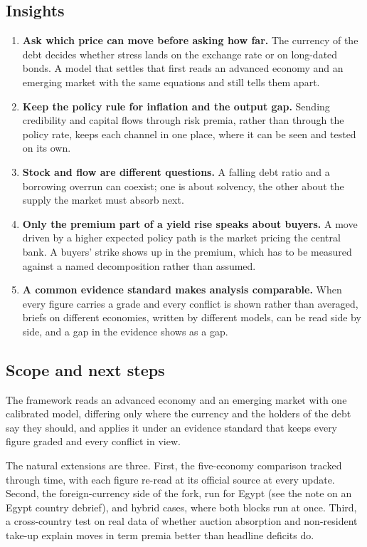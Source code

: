 \documentclass[
  british,
  a4paper,
]{article}
\providecommand{\tightlist}{%
  \setlength{\itemsep}{0pt}\setlength{\parskip}{0pt}}
\begin{document}
\subsection{Insights}\label{insights}

\begin{enumerate}
\def\labelenumi{\arabic{enumi}.}
\tightlist
\item
  \textbf{Ask which price can move before asking how far.} The currency
  of the debt decides whether stress lands on the exchange rate or on
  long-dated bonds. A model that settles that first reads an advanced
  economy and an emerging market with the same equations and still tells
  them apart.
\item
  \textbf{Keep the policy rule for inflation and the output gap.}
  Sending credibility and capital flows through risk premia, rather than
  through the policy rate, keeps each channel in one place, where it can
  be seen and tested on its own.
\item
  \textbf{Stock and flow are different questions.} A falling debt ratio
  and a borrowing overrun can coexist; one is about solvency, the other
  about the supply the market must absorb next.
\item
  \textbf{Only the premium part of a yield rise speaks about buyers.} A
  move driven by a higher expected policy path is the market pricing the
  central bank. A buyers' strike shows up in the premium, which has to
  be measured against a named decomposition rather than assumed.
\item
  \textbf{A common evidence standard makes analysis comparable.} When
  every figure carries a grade and every conflict is shown rather than
  averaged, briefs on different economies, written by different models,
  can be read side by side, and a gap in the evidence shows as a gap.
\end{enumerate}

\subsection{Scope and next steps}\label{scope-and-next-steps}

The framework reads an advanced economy and an emerging market with one
calibrated model, differing only where the currency and the holders of
the debt say they should, and applies it under an evidence standard that
keeps every figure graded and every conflict in view.

The natural extensions are three. First, the five-economy comparison
tracked through time, with each figure re-read at its official source at
every update. Second, the foreign-currency side of the fork, run for
Egypt (see the note on an Egypt country debrief), and hybrid cases,
where both blocks run at once. Third, a cross-country test on real data
of whether auction absorption and non-resident take-up explain moves in
term premia better than headline deficits do.
\end{document}
